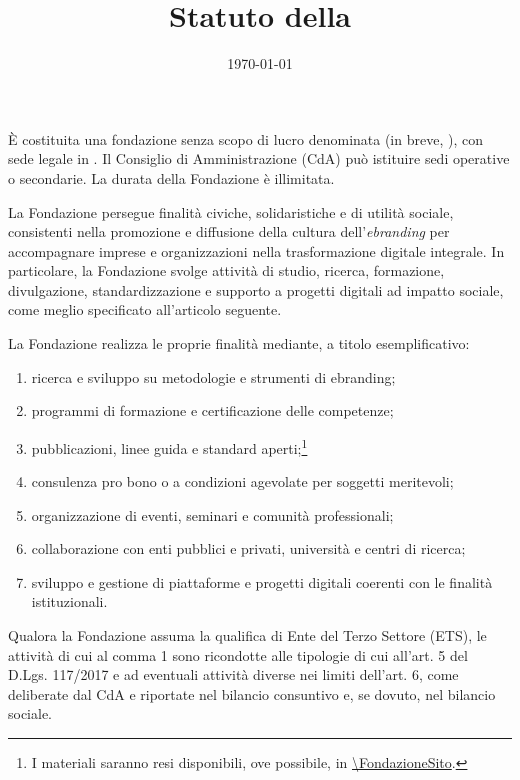 \documentclass[11pt,a4paper]{article}
\title{Statuto della \FondazioneNome}
\author{}
\date{\today}
\begin{document}
\begin{center}
\end{center}

\maketitle

 È costituita una fondazione senza scopo di lucro denominata  (in breve, \FondazioneSigla), con sede legale in . Il Consiglio di Amministrazione (CdA) può istituire sedi operative o secondarie.
 La durata della Fondazione è illimitata.

 La Fondazione persegue finalità civiche, solidaristiche e di utilità sociale, consistenti nella promozione e diffusione della cultura dell'\emph{ebranding} per accompagnare imprese e organizzazioni nella trasformazione digitale integrale.
 In particolare, la Fondazione svolge attività di studio, ricerca, formazione, divulgazione, standardizzazione e supporto a progetti digitali ad impatto sociale, come meglio specificato all'articolo seguente.

 La Fondazione realizza le proprie finalità mediante, a titolo esemplificativo:
\FondazioneAttivita
\begin{enumerate}[label=\alph*)]
  \item ricerca e sviluppo su metodologie e strumenti di ebranding;
  \item programmi di formazione e certificazione delle competenze;
  \item pubblicazioni, linee guida e standard aperti;\footnote{I materiali saranno resi disponibili, ove possibile, in \url{\FondazioneSito}.}
  \item consulenza pro bono o a condizioni agevolate per soggetti meritevoli;
  \item organizzazione di eventi, seminari e comunità professionali;
  \item collaborazione con enti pubblici e privati, università e centri di ricerca;
  \item sviluppo e gestione di piattaforme e progetti digitali coerenti con le finalità istituzionali.
\end{enumerate}
\ifETS
{} Qualora la Fondazione assuma la qualifica di Ente del Terzo Settore (ETS), le attività di cui al comma 1 sono ricondotte alle tipologie di cui all'art. 5 del D.Lgs. 117/2017 e ad eventuali attività diverse nei limiti dell'art. 6, come deliberate dal CdA e riportate nel bilancio consuntivo e, se dovuto, nel bilancio sociale.
\fi
\end{document}
